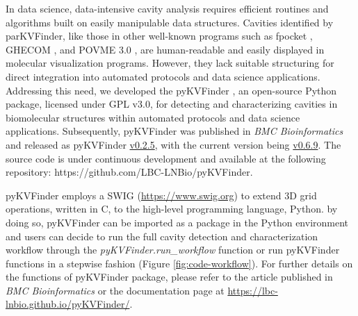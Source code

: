 \documentclass[Ingles]{phdthesis}
\begin{document}
In data science, data-intensive cavity analysis requires efficient routines and algorithms built on easily manipulable data structures. Cavities identified by parKVFinder, like those in other well-known programs such as fpocket \cite{fpocket}, GHECOM \cite{ghecom}, and POVME 3.0 \cite{povme}, are human-readable and easily displayed in molecular visualization programs. However, they lack suitable structuring for direct integration into automated protocols and data science applications. Addressing this need, we developed the \ac{pyKVFinder} \cite{guerra2021}, an open-source Python package, licensed under GPL v3.0, for detecting and characterizing cavities in biomolecular structures within automated protocols and data science applications. Subsequently, pyKVFinder was published in \textit{BMC Bioinformatics} \cite{guerra2021} and released as pyKVFinder \href{https://github.com/LBC-LNBio/pyKVFinder/releases/tag/v0.2.5}{v0.2.5}, with the current version being \href{https://github.com/LBC-LNBio/pyKVFinder/releases/tag/v0.6.9}{v0.6.9}. The source code is under continuous development and available at the following repository: https://github.com/LBC-LNBio/pyKVFinder.

pyKVFinder employs a \ac{SWIG} (\url{https://www.swig.org}) to extend \acs{3D} grid operations, written in C, to the high-level programming language, Python. by doing so, pyKVFinder can be imported as a package in the Python environment and users can decide to run the full cavity detection and characterization workflow through the \textit{pyKVFinder.run\_workflow} function or run pyKVFinder functions in a stepwise fashion (Figure \ref{fig:code-workflow}). For further details on the functions of pyKVFinder package, please refer to the article published in \textit{BMC Bioinformatics} \cite{guerra2021} or the documentation page at \url{https://lbc-lnbio.github.io/pyKVFinder/}.
\end{document}
